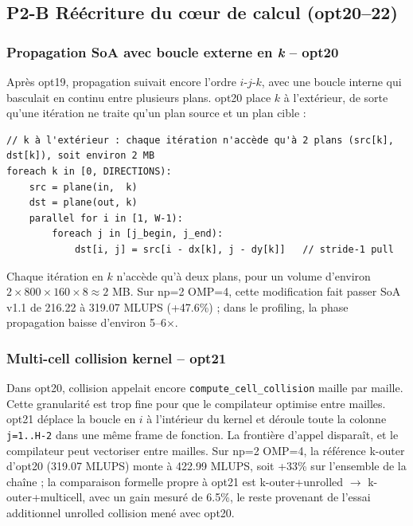\documentclass[a4paper,11pt,oneside]{report}
\newcommand{\code}[1]{\texttt{#1}}
\begin{document}
\subsection{P2-B \quad Réécriture du cœur de calcul (opt20–22)}

\subsubsection{Propagation SoA avec boucle externe en \textit{k} -- opt20}

Après opt19, propagation suivait encore l'ordre $i$-$j$-$k$, avec une boucle interne qui basculait en continu entre plusieurs plans.
opt20 place $k$ à l'extérieur, de sorte qu'une itération ne traite qu'un plan source et un plan cible :

\begin{lstlisting}[language={}]
// k à l'extérieur : chaque itération n'accède qu'à 2 plans (src[k], dst[k]), soit environ 2 MB
foreach k in [0, DIRECTIONS):
    src = plane(in,  k)
    dst = plane(out, k)
    parallel for i in [1, W-1):
        foreach j in [j_begin, j_end):
            dst[i, j] = src[i - dx[k], j - dy[k]]   // stride-1 pull
\end{lstlisting}

Chaque itération en $k$ n'accède qu'à deux plans, pour un volume d'environ
$2 \times 800 \times 160 \times 8 \approx 2$ MB. Sur np=2 OMP=4, cette modification fait passer SoA v1.1 de 216.22 à 319.07 MLUPS (+47.6\%) ; dans le profiling, la phase
propagation baisse d'environ 5--6$\times$.

\subsubsection{Multi-cell collision kernel -- opt21}

Dans opt20, collision appelait encore \code{compute\_cell\_collision} maille par maille. Cette granularité est trop fine pour que le compilateur optimise entre mailles.
opt21 déplace la boucle en $i$ à l'intérieur du kernel et déroule toute la colonne \code{j=1..H-2} dans une même frame de fonction. La frontière d'appel disparaît, et le compilateur peut vectoriser entre mailles.
Sur np=2 OMP=4, la référence k-outer d'opt20 (319.07 MLUPS) monte à 422.99 MLUPS, soit +33\% sur l'ensemble de la chaîne ; la comparaison formelle propre à opt21 est k-outer+unrolled $\to$ k-outer+multicell, avec un gain mesuré de 6.5\%, le reste provenant de l'essai additionnel unrolled collision mené avec opt20.
\end{document}
